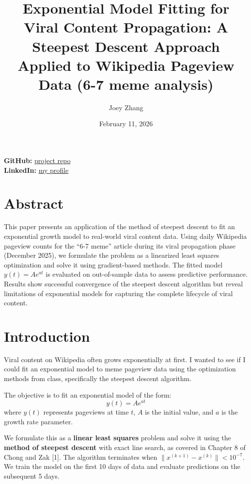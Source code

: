 \documentclass[11pt]{article}
\title{Exponential Model Fitting for Viral Content Propagation: A Steepest Descent Approach Applied to Wikipedia Pageview Data (6-7 meme analysis)}
\author{Joey Zhang}
\date{February 11, 2026}
\begin{document}
\maketitle

\noindent
\textbf{GitHub:} \href{https://github.com/joeyzhang-dev/67-meme-steepest-descent}{project repo} \\
\textbf{LinkedIn:} \href{https://www.linkedin.com/in/joeyzhangdev/}{my profile}

\hrulefill

\section*{Abstract}

This paper presents an application of the method of steepest descent to fit an exponential growth model to real-world viral content data. Using daily Wikipedia pageview counts for the ``6-7 meme'' article during its viral propagation phase (December 2025), we formulate the problem as a linearized least squares optimization and solve it using gradient-based methods. The fitted model $y(t)=A e^{a t}$ is evaluated on out-of-sample data to assess predictive performance. Results show successful convergence of the steepest descent algorithm but reveal limitations of exponential models for capturing the complete lifecycle of viral content.

\section{Introduction}

Viral content on Wikipedia often grows exponentially at first. I wanted to see if I could fit an exponential model to meme pageview data using the optimization methods from class, specifically the steepest descent algorithm.

The objective is to fit an exponential model of the form:
\begin{equation}
y(t)=A e^{a t}
\end{equation}
where $y(t)$ represents pageviews at time $t$, $A$ is the initial value, and $a$ is the growth rate parameter.

We formulate this as a \textbf{linear least squares} problem and solve it using the \textbf{method of steepest descent} with exact line search, as covered in Chapter 8 of Chong and Zak [1]. The algorithm terminates when $\|x^{(k+1)}-x^{(k)}\|<10^{-7}$. We train the model on the first 10 days of data and evaluate predictions on the subsequent 5 days.
\end{document}
